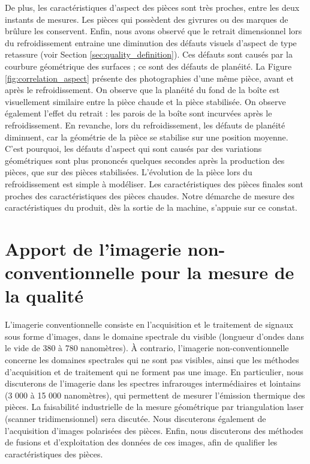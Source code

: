 De plus, les caractéristiques d'aspect des pièces sont très proches, entre les deux instants de mesures.
Les pièces qui possèdent des givrures ou des marques de brûlure les conservent.
Enfin, nous avons observé que le retrait dimensionnel lors du refroidissement entraine une diminution des défauts visuels d'aspect de type retassure (voir Section \ref{sec:quality_definition}).
Ces défauts sont causés par la courbure géométrique des surfaces ; ce sont des défauts de planéité.
La Figure \ref{fig:correlation_aspect} présente des photographies d'une même pièce, avant et après le refroidissement.
On observe que la planéité du fond de la boîte est visuellement similaire entre la pièce chaude et la pièce stabilisée.
On observe également l'effet du retrait : les parois de la boîte sont incurvées après le refroidissement.
En revanche, lors du refroidissement, les défauts de planéité diminuent, car la géométrie de la pièce se stabilise sur une position moyenne.
C'est pourquoi, les défauts d'aspect qui sont causés par des variations géométriques sont plus prononcés quelques secondes après la production des pièces, que sur des pièces stabilisées.
L'évolution de la pièce lors du refroidissement est simple à modéliser.
Les caractéristiques des pièces finales sont proches des caractéristiques des pièces chaudes.
Notre démarche de mesure des caractéristiques du produit, dès la sortie de la machine, s'appuie sur ce constat.

\section{Apport de l'imagerie non-conventionnelle pour la mesure de la qualité} \label{sec:non_conventional_imaging}

L'imagerie conventionnelle consiste en l'acquisition et le traitement de signaux sous forme d'images, dans le domaine spectrale du visible (longueur d'ondes dans le vide de 380 à 780 nanomètres).
À contrario, l'imagerie non-conventionnelle concerne les domaines spectrales qui ne sont pas visibles, ainsi que les méthodes d'acquisition et de traitement qui ne forment pas une image.
En particulier, nous discuterons de l'imagerie dans les spectres infrarouges intermédiaires et lointains (3 000 à 15 000 nanomètres), qui permettent de mesurer l'émission thermique des pièces.
La faisabilité industrielle de la mesure géométrique par triangulation laser (scanner tridimensionnel) sera discutée.
Nous discuterons également de l'acquisition d'images polarisées des pièces.
Enfin, nous discuterons des méthodes de fusions et d'exploitation des données de ces images, afin de qualifier les caractéristiques des pièces.

